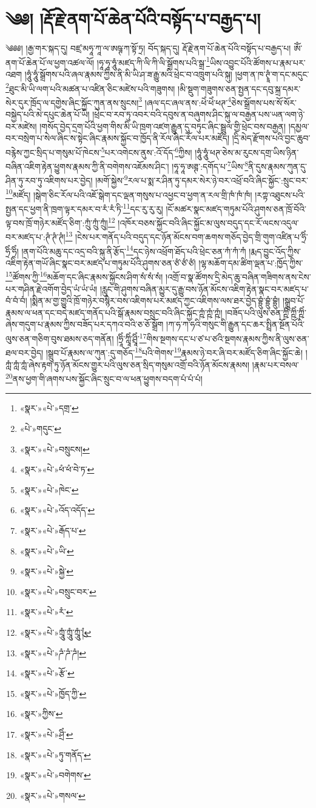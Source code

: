 \chapter{༄༅། །རྡོ་རྗེ་ནག་པོ་ཆེན་པོའི་བསྟོད་པ་བརྒྱད་པ།}༄༅༅། །རྒྱ་གར་སྐད་དུ། བཛྲ་མཧཱ་ཀཱ་ལ་ཨཥྚ་ཀ་སྟོ་ཏྲ། བོད་སྐད་དུ། རྡོ་རྗེ་ནག་པོ་ཆེན་པོའི་བསྟོད་པ་བརྒྱད་པ། ཨོཾ་ནག་པོ་ཆེན་པོ་ལ་ཕྱག་འཚལ་ལོ། །ཧཱ་ཧཱ་ཧཱུཾ་མཛད་ཀི་ལི་ཀི་ལི་སྒྲོགས་པའི་སྒྲ་\footnote{«སྣར་»«པེ་»དགྲ་}ཡིས་འབྱུང་པོའི་ཚོགས་པ་རྣམ་པར་འཐག །ཧཱུཾ་ཧཱུཾ་སྒྲོགས་པའི་ཞལ་རྣམས་ཀྱིས་ནི་མི་ཡི་ཤ་ཟ་རྒྱུ་མའི་ཕྲེང་བ་འཁྲུག་པའི་སྐུ། །ཕྱག་ན་ཁ་ཊྭཱཾ་ག་དང་མདུང་\footnote{«པེ་»གདུང་}ཐུང་མི་ཡི་ལག་པའི་མཚན་པ་འཛིན་ཅིང་མཛེས་པའི་གཟུགས། །མི་སྡུག་གཟུགས་ཅན་སྤྱན་དང་དབུ་སྐྲ་དམར་སེར་དུར་ཁྲོད་ལ་དགྱེས་ཞིང་སྐྱོང་ཀུན་ནས་སྲུངས།\footnote{«སྣར་»«པེ་»བསྲུངས།} །ཞལ་དང་ཞལ་ནས་:ཕེཾ་ཕེཾ་ཕཊ་\footnote{«སྣར་»«པེ་»ཕཾ་ཕཾ་བེ་ཏ་}ཅེས་སྒྲོགས་པས་སོ་སོར་བསྐྱེད་པའི་མེ་དཔུང་ཆེན་པོ་ཡི། །ཕྲེང་བ་རབ་ཏུ་འབར་བའི་དབུས་ན་བཞུགས་ཤིང་སྐུ་ལ་བརྒྱན་པས་ཡན་ལག་ཉེ་བར་མཛེས། །གསོད་བྱེད་དྲག་པོའི་ཕྱག་གིས་མི་ཡི་ཁྲག་འཛག་རྒྱུན་དུ་བཏུང་ཞིང་སྦྲུལ་གྱི་ཕྲེང་བས་བརྒྱན། །དམྱལ་བར་བསྲེག་པ་སེལ་ཞིང་ས་སྟེང་ཞིང་རྣམས་སྐྱོང་བ་ཁྱོད་ནི་རོལ་ཞིང་རོལ་པར་མཛོད། །དྲི་མེད་རྫོགས་པའི་བྱང་ཆུབ་བརྙེས་ཀྱང་སྲིད་པ་གསུམ་པོ་ཁེངས་\footnote{«སྣར་»«པེ་»ཁེང་}པར་འགེངས་ནུས་:འོ་དོད་\footnote{«སྣར་»«པེ་»འོད་འདོད་}ཀྱིས། །ཧཱུཾ་ཧཱུཾ་ཕཊ་ཅེས་མ་རུངས་དགྲ་ཡིས་ཉིན་བཞིན་འཇིག་རྟེན་ཕྱུགས་རྣམས་ཀྱི་ནི་བགེགས་འཇོམས་ཤིང་། །ཧཱ་ཧཱ་ཨཊྚ་:དགོད་པ་\footnote{«སྣར་»«པེ་»རྒོད་པ་}ཡིས་\footnote{«སྣར་»«པེ་»ཡི་}ནི་དུས་རྣམས་ཀུན་དུ་ཤིན་ཏུ་རབ་ཏུ་འཇིགས་པར་བྱེད། །མགོ་སྐྱེས་\footnote{«སྣར་»«པེ་»སྐྱེ་}རལ་པ་སྨ་ར་ཤིན་ཏུ་དམར་སེར་ཉེ་བར་འཕྲོ་བའི་ཞིང་སྐྱོང་:སྲུང་བར་\footnote{«སྣར་»«པེ་»བསྲུང་བར་}མཛོད། །སྒེག་ཅིང་རོལ་པའི་འཇོ་སྒེག་དང་ལྡན་གསུས་པ་འཕྱང་བ་ཕྱག་ན་རལ་གྲི་ཁཾ་ཁཾ་ཁཾ། །རཀྟ་འཐུངས་པའི་སྤྱན་དང་ཕྱག་ནི་ཁྲག་ལྟར་དམར་བ་རཾ་རཾ་ཏི་\footnote{«སྣར་»«པེ་»རཾ་}དང་རུ་རུ་རུ། །ངོ་མཚར་སྣང་མཛད་གཏུམ་པོའི་ཤུགས་ཅན་ཁྲོ་བོའི་ལྟ་བས་ཁྲོ་གཉེར་མཛོད་ཅིག་:ཀྲུཾ་ཀྲུཾ་ཀྲུཾ།\footnote{«སྣར་»«པེ་»ཀྲཱུཾ་ཀྲཱུཾ་ཀྲཱུཾ་ུཾ།} །འཁོར་བཅས་སྐྱོང་བའི་ཞིང་སྐྱོང་མ་ལུས་བདུད་དང་རོ་ལངས་འདུལ་བར་མཛད་པ་:ཊཾ་ཊཾ་ཊཾ།\footnote{«སྣར་»«པེ་»ཌཾ་ཌཾ་ཌཾ།} །ངེས་པར་གནོད་པའི་བདུད་དང་ཉོན་མོངས་བག་ཆགས་གཅོད་བྱེད་གྲི་གུག་འཛིན་པ་ཧྲིཾ་ཧྲིཾ་ཧྲིཾ། །ནག་པོའི་མཆུ་དང་འདྲ་བའི་སྐུ་ནི་རྩོད་\footnote{«སྣར་»«པེ་»རྩོ་}དང་ཉེས་འཕྲོག་ཐོད་པའི་ཕྲེང་ཅན་ཀཾ་ཀཾ་ཀཾ །རྨད་བྱུང་འོད་ཀྱིས་འཇིག་རྟེན་གཡོ་ཞིང་སྣང་བར་མཛད་པ་གཏུམ་པོའི་ཤུགས་ཅན་ཙཾ་ཙཾ་ཙཾ། །ལྷ་མཆོག་དམ་ཚིག་ལྡན་པ་:ཁྱོད་ཀྱིས་\footnote{«སྣར་»«པེ་»ཁྱོད་ཀྱི་}ཚོགས་ཀྱི་\footnote{«སྣར་»ཀྱིས་}མཆོག་དང་ཞིང་རྣམས་སྐྱོངས་ཤིག་སཾ་སཾ་སཾ། །འགྲོ་བ་སྣ་ཚོགས་དྲི་མེད་ཆུ་བཞིན་གཟིགས་ནས་ངེས་པར་གཤིན་རྗེ་འགོག་བྱེད་ཡཾ་ཡཾ་ཡཾ། །རླུང་གི་ཤུགས་བཞིན་མྱུར་དུ་རྒྱུ་བས་ཉོན་མོངས་འཇིག་རྟེན་སྣང་བར་མཛད་པ་བཾ་བཾ་བཾ། །སྨིན་མ་གྱ་གྱུའི་ཁྲོ་གཉེར་བསྙེར་བས་འཇིགས་པར་མཛད་ཀྱང་འཇིགས་ལས་ཐར་བྱེད་བྷྲུཾ་བྷྲུཾ་བྷྲུཾ། །སྒྲུབ་པོ་རྣམས་ལ་ཕན་དང་བདེ་མཛད་གནོད་པའི་སྒོ་རྣམས་བསྲུང་བའི་ཞིང་སྐྱོང་ཀྵཾ་ཀྵཾ་ཀྵཾ། །བཟོད་པའི་ལུས་ཅན་ཀྵིཾ་ཀྵིཾ་ཀྵིཾ་ཞེས་གདུག་པ་རྣམས་ཀྱིས་བཟོད་པར་དཀའ་བའི་ཅ་ཅོ་སྒྲོག །ཀ་ཧ་ཀ་ཧའི་གསུང་གི་རྒྱུན་དང་ཆར་སྤྲིན་སྔོན་པོའི་ལུས་ཅན་གཅིག་བུས་ཐམས་ཅད་གནོན། །ཧྲཱིཾ་ཀླཱིཾ་ཤྲཱིཾ་\footnote{«སྣར་»«པེ་»ཤྲིཾ་}གིས་སྔགས་དང་པ་ཙ་པ་ཙའི་སྔགས་རྣམས་ཀྱིས་ནི་ལུས་ཅན་ཐལ་བར་བྱེད། །སྒྲུབ་པོ་རྣམས་ལ་ཀུན་:དུ་གཅོད་\footnote{«སྣར་»«པེ་»ཏུ་གནོད་}པའི་གེགས་\footnote{«སྣར་»«པེ་»བགེགས་}རྣམས་ཉེ་བར་ཞི་བར་མཛོད་ཅིག་ཞིང་སྐྱོང་ཆེ། །ཀླཾ་ཀླཾ་ཀླཾ་ཞེས་རྟག་ཏུ་ཉོན་མོངས་གྱུར་པའི་ལུས་ཅན་སྲིད་གསུམ་འགྲོ་བའི་ཉོན་མོངས་རྣམས། །རྣམ་པར་བསལ་\footnote{«སྣར་»«པེ་»གསལ་}ནས་ཕྱག་གི་ཞགས་པས་སྐྱོང་ཞིང་སྲུང་བ་ལ་ཕན་ཕྱུགས་བདག་པཾ་པཾ་པཾ། 